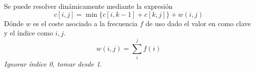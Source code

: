 \documentclass[tikz,11pt,fleqn]{book} %
\begin{document}
\begin{theorem}
	Se puede resolver dinámicamente mediante la expresión
	$$ c[i,j]=\min\{c[i,k-1]+c[k,j] \}+w(i,j) $$
	Dónde $w$ es el coste asociado a la frecuencia $f$ de uso dado el valor en como clave y el índice como $i,j$.
	$$ w(i,j)=\sum_{i}^jf(i) $$
	\textit{Ignorar     índice 0, tomar desde 1.}
\end{theorem}
\end{document}
